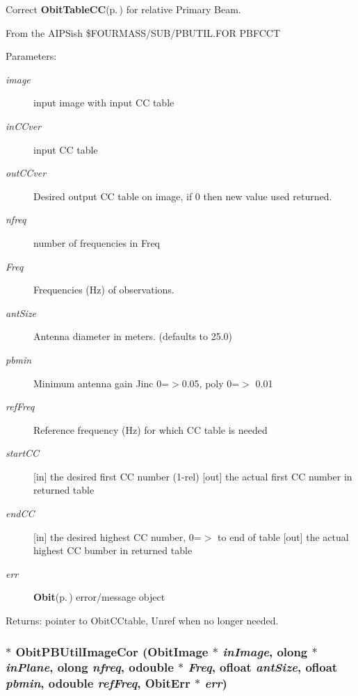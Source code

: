 Correct {\bf Obit\-Table\-CC}{\rm (p.\,\pageref{structObitTableCC})} for relative Primary Beam. 

From the AIPSish \$FOURMASS/SUB/PBUTIL.FOR PBFCCT \begin{Desc}
\item[Parameters:]
\begin{description}
\item[{\em image}]input image with input CC table \item[{\em in\-CCver}]input CC table \item[{\em out\-CCver}]Desired output CC table on image, if 0 then new value used returned. \item[{\em nfreq}]number of frequencies in Freq \item[{\em Freq}]Frequencies (Hz) of observations. \item[{\em ant\-Size}]Antenna diameter in meters. (defaults to 25.0) \item[{\em pbmin}]Minimum antenna gain Jinc 0=$>$0.05, poly 0=$>$ 0.01 \item[{\em ref\-Freq}]Reference frequency (Hz) for which CC table is needed \item[{\em start\-CC}][in] the desired first CC number (1-rel) [out] the actual first CC number in returned table \item[{\em end\-CC}][in] the desired highest CC number, 0=$>$ to end of table [out] the actual highest CC bumber in returned table \item[{\em err}]{\bf Obit}{\rm (p.\,\pageref{structObit})} error/message object \end{description}
\end{Desc}
\begin{Desc}
\item[Returns:]pointer to Obit\-CCtable, Unref when no longer needed. \end{Desc}
\subsubsection{$\ast$ Obit\-PBUtil\-Image\-Cor ({\bf Obit\-Image} $\ast$ {\em in\-Image}, {\bf olong} $\ast$ {\em in\-Plane}, {\bf olong} {\em nfreq}, {\bf odouble} $\ast$ {\em Freq}, {\bf ofloat} {\em ant\-Size}, {\bf ofloat} {\em pbmin}, {\bf odouble} {\em ref\-Freq}, {\bf Obit\-Err} $\ast$ {\em err})}\label{ObitPBUtil_8h_a5}


